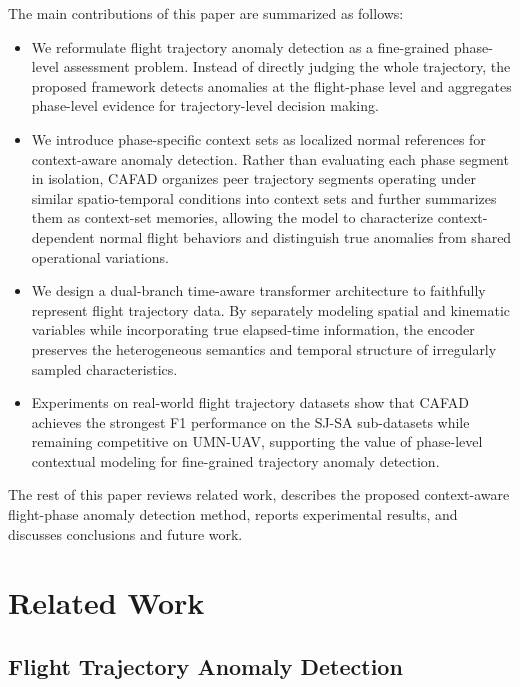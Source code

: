 \documentclass[iicol,pdflatex,sn-basic,Numbered]{sn-jnl}%
\theoremstyle{thmstyleone}%
\theoremstyle{thmstyletwo}%
\theoremstyle{thmstylethree}%
\begin{document}
The main contributions of this paper are summarized as follows:
\begin{itemize}
    \item We reformulate flight trajectory anomaly detection as a fine-grained phase-level assessment problem. 
    Instead of directly judging the whole trajectory, the proposed framework detects anomalies at the flight-phase level and aggregates phase-level evidence for trajectory-level decision making.

    \item We introduce phase-specific context sets as localized normal references for context-aware anomaly detection.
    Rather than evaluating each phase segment in isolation, CAFAD organizes peer trajectory segments operating under similar spatio-temporal conditions into context sets and further summarizes them as context-set memories, allowing the model to characterize context-dependent normal flight behaviors and distinguish true anomalies from shared operational variations.

    \item We design a dual-branch time-aware transformer architecture to faithfully represent flight trajectory data. 
    By separately modeling spatial and kinematic variables while incorporating true elapsed-time information, the encoder preserves the heterogeneous semantics and temporal structure of irregularly sampled characteristics.

    \item Experiments on real-world flight trajectory datasets show that CAFAD achieves the strongest F1 performance on the SJ-SA sub-datasets while remaining competitive on UMN-UAV, supporting the value of phase-level contextual modeling for fine-grained trajectory anomaly detection.
\end{itemize}

The rest of this paper reviews related work, describes the proposed context-aware flight-phase anomaly detection method, reports experimental results, and discusses conclusions and future work.

\section{Related Work}\label{sec:related_work}

\subsection{Flight Trajectory Anomaly Detection}
\end{document}
